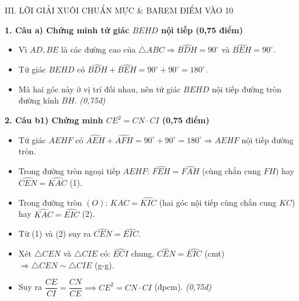 \documentclass[11pt,a4paper]{article}
\begin{document}
\begin{solutionbox}{III. LỜI GIẢI XUÔI CHUẨN MỰC \& BAREM ĐIỂM VÀO 10}

\textbf{1. Câu a) Chứng minh tứ giác $BEHD$ nội tiếp (0,75 điểm)}
\begin{itemize}[leftmargin=5mm]
    \item Vì $AD, BE$ là các đường cao của $\triangle ABC \Rightarrow \widehat{BDH} = 90^\circ$ và $\widehat{BEH} = 90^\circ$.
    \item Tứ giác $BEHD$ có $\widehat{BDH} + \widehat{BEH} = 90^\circ + 90^\circ = 180^\circ$.
    \item Mà hai góc này ở vị trí đối nhau, nên tứ giác $BEHD$ nội tiếp đường tròn đường kính $BH$. \hfill \textit{(0,75đ)}
\end{itemize}

\vspace{1.5mm}
\textbf{2. Câu b1) Chứng minh $CE^2 = CN \cdot CI$ (0,75 điểm)}
\begin{itemize}[leftmargin=5mm]
    \item Tứ giác $AEHF$ có $\widehat{AEH} + \widehat{AFH} = 90^\circ + 90^\circ = 180^\circ \Rightarrow AEHF$ nội tiếp đường tròn.
    \item Trong đường tròn ngoại tiếp $AEHF$: $\widehat{FEH} = \widehat{FAH}$ (cùng chắn cung $FH$) hay $\widehat{CEN} = \widehat{KAC}$ (1).
    \item Trong đường tròn $(O)$: $\widehat{KAC} = \widehat{KIC}$ (hai góc nội tiếp cùng chắn cung $KC$) hay $\widehat{KAC} = \widehat{EIC}$ (2).
    \item Từ (1) và (2) suy ra $\widehat{CEN} = \widehat{EIC}$.
    \item Xét $\triangle CEN$ và $\triangle CIE$ có: $\widehat{ECI}$ chung, $\widehat{CEN} = \widehat{EIC}$ (cmt)
    $\Rightarrow \triangle CEN \sim \triangle CIE$ (g-g).
    \item Suy ra $\dfrac{CE}{CI} = \dfrac{CN}{CE} \implies CE^2 = CN \cdot CI$ (đpcm). \hfill \textit{(0,75đ)}
\end{itemize}


\end{solutionbox}
\end{document}
